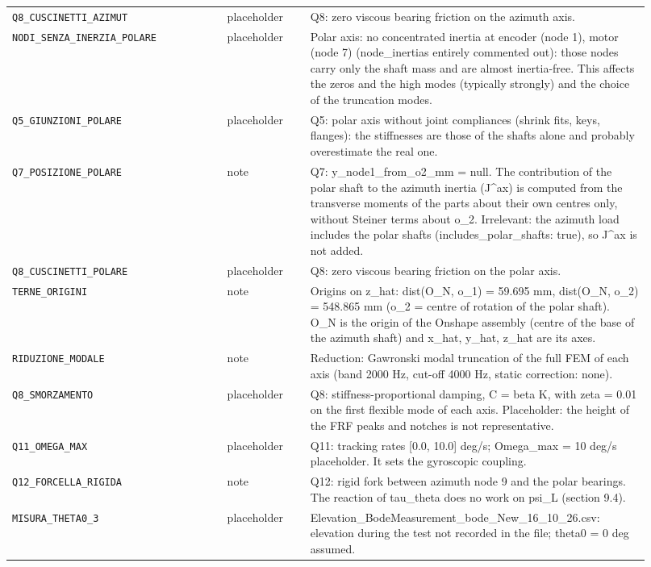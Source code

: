 \documentclass[10pt,a4paper]{article}
\numberwithin{equation}{section}
\begin{document}
\begin{longtable}{p{0.31\linewidth}p{0.12\linewidth}p{0.49\linewidth}}
\texttt{Q8\_CUSCINETTI\_AZIMUT} & placeholder & Q8: zero viscous bearing friction on the azimuth axis. \\
\texttt{NODI\_SENZA\_INERZIA\_POLARE} & placeholder & Polar axis: no concentrated inertia at encoder (node 1), motor (node 7) (node\_inertias entirely commented out): those nodes carry only the shaft mass and are almost inertia-free. This affects the zeros and the high modes (typically strongly) and the choice of the truncation modes. \\
\texttt{Q5\_GIUNZIONI\_POLARE} & placeholder & Q5: polar axis without joint compliances (shrink fits, keys, flanges): the stiffnesses are those of the shafts alone and probably overestimate the real one. \\
\texttt{Q7\_POSIZIONE\_POLARE} & note & Q7: y\_node1\_from\_o2\_mm = null. The contribution of the polar shaft to the azimuth inertia (J\^{}ax) is computed from the transverse moments of the parts about their own centres only, without Steiner terms about o\_2. Irrelevant: the azimuth load includes the polar shafts (includes\_polar\_shafts: true), so J\^{}ax is not added. \\
\texttt{Q8\_CUSCINETTI\_POLARE} & placeholder & Q8: zero viscous bearing friction on the polar axis. \\
\texttt{TERNE\_ORIGINI} & note & Origins on z\_hat: dist(O\_N, o\_1) = 59.695 mm, dist(O\_N, o\_2) = 548.865 mm (o\_2 = centre of rotation of the polar shaft). O\_N is the origin of the Onshape assembly (centre of the base of the azimuth shaft) and x\_hat, y\_hat, z\_hat are its axes. \\
\texttt{RIDUZIONE\_MODALE} & note & Reduction: Gawronski modal truncation of the full FEM of each axis (band 2000 Hz, cut-off 4000 Hz, static correction: none). \\
\texttt{Q8\_SMORZAMENTO} & placeholder & Q8: stiffness-proportional damping, C = beta K, with zeta = 0.01 on the first flexible mode of each axis. Placeholder: the height of the FRF peaks and notches is not representative. \\
\texttt{Q11\_OMEGA\_MAX} & placeholder & Q11: tracking rates [0.0, 10.0] deg/s; Omega\_max = 10 deg/s placeholder. It sets the gyroscopic coupling. \\
\texttt{Q12\_FORCELLA\_RIGIDA} & note & Q12: rigid fork between azimuth node 9 and the polar bearings. The reaction of tau\_theta does no work on psi\_L (section 9.4). \\
\texttt{MISURA\_THETA0\_3} & placeholder & Elevation\_BodeMeasurement\_bode\_New\_16\_10\_26.csv: elevation during the test not recorded in the file; theta0 = 0 deg assumed. \\

\end{longtable}
\end{document}
